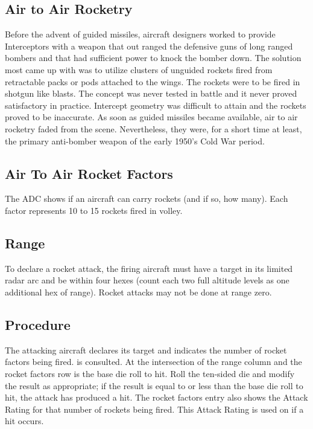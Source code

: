 
\begin{advancedrules}

    \section{Air to Air Rocketry}

    \label{rule:air-to-air-rocket-combat}

    Before the advent of guided missiles, aircraft designers worked to provide Interceptors with a weapon that out ranged the defensive guns of long ranged bombers and that had sufficient power to knock the bomber down. The solution most came up with was to utilize clusters of unguided rockets fired from retractable packs or pods attached to the wings. The rockets were to be fired in shotgun like blasts. The concept was never tested in battle and it never proved satisfactory in practice. Intercept geometry was difficult to attain and the rockets proved to be inaccurate. As soon as guided missiles became available, air to air rocketry faded from the scene. Nevertheless, they were, for a short time at least, the primary anti-bomber weapon of the early 1950's Cold War period.

    \subsection{Air To Air Rocket Factors} The ADC shows if an aircraft can carry rockets (and if so, how many). Each factor represents 10 to 15 rockets fired in volley.

    \subsection{Range} To declare a rocket attack, the firing aircraft must have a target in its limited radar arc and be within four hexes (count each two full altitude levels as one additional hex of range). Rocket attacks may not be done at range zero.

    \subsection{Procedure} The attacking aircraft declares its target and indicates the number of rocket factors being fired.  is consulted. At the intersection of the range column and the rocket factors row is the base die roll to hit. Roll the ten-sided die and modify the result as appropriate; if the result is equal to or less than the base die roll to hit, the attack has produced a hit. The rocket factors entry also shows the Attack Rating for that number of rockets being fired. This Attack Rating is used on  if a hit occurs.


\end{advancedrules}
